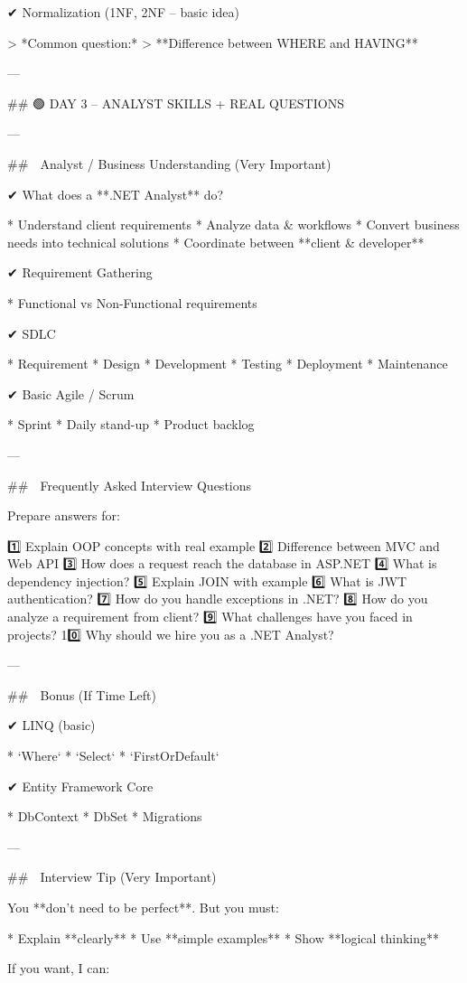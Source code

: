 ✔ Normalization (1NF, 2NF – basic idea)

> *Common question:*
> **Difference between WHERE and HAVING**

---

## 🟢 DAY 3 – ANALYST SKILLS + REAL QUESTIONS

---

## 🔶 Analyst / Business Understanding (Very Important)

✔ What does a **.NET Analyst** do?

* Understand client requirements
* Analyze data & workflows
* Convert business needs into technical solutions
* Coordinate between **client & developer**

✔ Requirement Gathering

* Functional vs Non-Functional requirements

✔ SDLC

* Requirement
* Design
* Development
* Testing
* Deployment
* Maintenance

✔ Basic Agile / Scrum

* Sprint
* Daily stand-up
* Product backlog

---

## 🔴 Frequently Asked Interview Questions

Prepare answers for:

1️⃣ Explain OOP concepts with real example
2️⃣ Difference between MVC and Web API
3️⃣ How does a request reach the database in ASP.NET
4️⃣ What is dependency injection?
5️⃣ Explain JOIN with example
6️⃣ What is JWT authentication?
7️⃣ How do you handle exceptions in .NET?
8️⃣ How do you analyze a requirement from client?
9️⃣ What challenges have you faced in projects?
10️⃣ Why should we hire you as a .NET Analyst?

---

## 📝 Bonus (If Time Left)

✔ LINQ (basic)

* `Where`
* `Select`
* `FirstOrDefault`

✔ Entity Framework Core

* DbContext
* DbSet
* Migrations

---

## 🧠 Interview Tip (Very Important)

You **don’t need to be perfect**.
But you must:

* Explain **clearly**
* Use **simple examples**
* Show **logical thinking**

If you want, I can:


